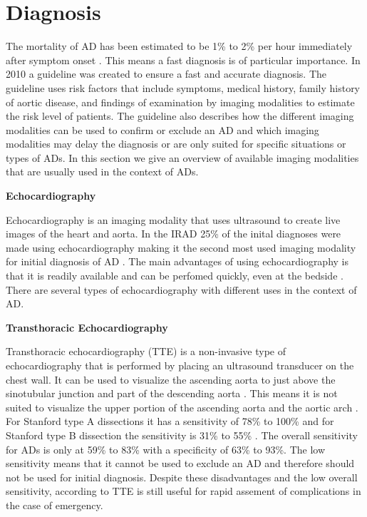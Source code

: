 \documentclass[thesis.tex]{subfiles}
\begin{document}
\section{Diagnosis}

The mortality of AD has been estimated to be 1\% to 2\% per hour immediately after symptom onset \cite{doi:10.1161/CIRCULATIONAHA.117.031264,meszaros2000epidemiology,goldfinger2014thoracic}. This means a fast diagnosis is of particular importance. In 2010 a guideline was created \cite{hiratzka20102010} to ensure a fast and accurate diagnosis. The guideline uses risk factors that include symptoms, medical history, family history of aortic disease, and findings of examination by imaging modalities to estimate the risk level of patients. The guideline also describes how the different imaging modalities can be used to confirm or exclude an AD and which imaging modalities may delay the diagnosis or are only suited for specific situations or types of ADs. In this section we give an overview of available imaging modalities that are usually used in the context of ADs.

\textbf{Echocardiography}

Echocardiography is an imaging modality that uses ultrasound to create live images of the heart and aorta. In the IRAD 25\% of the inital diagnoses were made using echocardiography making it the second most used imaging modality for initial diagnosis of AD \cite{doi:10.1161/CIRCULATIONAHA.117.031264}. The main advantages of using echocardiography is that it is readily available and can be perfomed quickly, even at the bedside \cite{baliga2014role}. There are several types of echocardiography with different uses in the context of AD.

\textbf{Transthoracic Echocardiography}

Transthoracic echocardiography (TTE) is a non-invasive type of echocardiography that is performed by placing an ultrasound transducer on the chest wall. It can be used to visualize the ascending aorta to just above the sinotubular junction and part of the descending aorta \cite{baliga2014role}. This means it is not suited to visualize the upper portion of the ascending aorta and the aortic arch \cite{baliga2014role}. For Stanford type A dissections it has a sensitivity of 78\% to 100\% and for Stanford type B dissection the sensitivity is 31\% to 55\% \cite{baliga2014role}. The overall sensitivity for ADs is only at 59\% to 83\% with a specificity of 63\% to 93\%. The low sensitivity means that it cannot be used to exclude an AD and therefore should not be used for initial diagnosis. Despite these disadvantages and the low overall sensitivity, according to \cite{baliga2014role} TTE is still useful for rapid assement of complications in the case of emergency. 
\end{document}
